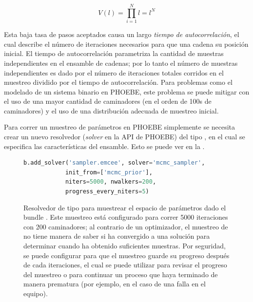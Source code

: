 \begin{eqfloat}[!ht]
	\centering
	\begin{equation}
		V(l) = \prod_{i = 1}^{N}{l} = l^N
	\end{equation}
\end{eqfloat}

Esta baja tasa de pasos aceptados causa un largo \textit{tiempo de
autocorrelación}, el cual describe el número de iteraciones necesarios para que
una cadena  su posición inicial. El tiempo de autocorrelación
parametriza la cantidad de muestras independientes en el ensamble de cadenas;
por lo tanto el número de muestras independientes es dado por el número de
iteraciones totales corridos en el muestreo dividido por el tiempo de
autocorrelación. Para problemas como el modelado de un sistema binario en
PHOEBE, este problema se puede mitigar con el uso de una mayor cantidad de
caminadores (en el orden de 100s de caminadores) y el uso de una distribución
adecuada de muestreo inicial.\

Para correr un muestreo de parámetros en PHOEBE simplemente se necesita crear un
nuevo resolvedor (\textit{solver} en la API de PHOEBE) del tipo , en
el cual se especifica las características del ensamble. Esto se puede ver en la .

\begin{figure}[!ht]
	\centering
	\begin{lstlisting}[language=Python, autogobble]
		b.add_solver('sampler.emcee', solver='mcmc_sampler',
			init_from=['mcmc_prior'], 
			niters=5000, nwalkers=200, 
			progress_every_niters=5)
	\end{lstlisting}
	\caption{Resolvedor de tipo  para muestrear el espacio de
	parámetros dado el bundle . Este muestreo está configurado para
	correr 5000 iteraciones con 200 caminadores; al contrario de un optimizador,
	el muestreo de  no tiene manera de saber si ha convergido a una
	solución para determinar cuando ha obtenido suficientes muestras. Por
	seguridad, se puede configurar para que el muestreo guarde su progreso
	después de cada  iteraciones, el cual se puede
	utilizar para revisar el progreso del muestreo o para continuar un proceso
	que haya terminado de manera prematura (por ejemplo, en el caso de una falla
	en el equipo).}
	\label{codigoMuestreoMCMC}
\end{figure}

